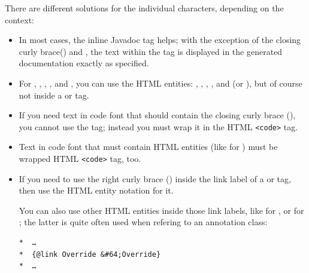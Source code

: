 There are different solutions for the individual characters, depending on the context:
\begin{itemize}
	\item{In most cases, the inline Javadoc tag  helps; with the exception of the closing curly brace(\bdq{\texttt{\}}}) and \bsq{\texttt{*/}}, the text within the tag is displayed in the generated documentation exactly as specified.}

	\item{For 
	\bsq{\texttt{\textless}}, 
	\bsq{\texttt{\textgreater}}, 
	\bsq{\texttt{\&}}, 
	, 
	 and 
	\bsq{\texttt{*/}}, you can use the 
	HTML entities: 
	, 
	, 
	, 
	, 
	 and 
	 (or 
	), but of course not inside a 
	 or 
	 tag.}

	\item{If you need text in code font that should contain the closing curly brace (\bsq{\texttt{\}}}), you cannot use the  tag; instead you must wrap it in the HTML \lstinline|<code>| tag.}

	\item{Text in code font that must contain HTML entities (like  for \bsq{\texttt{*/}}) must be wrapped HTML \lstinline|<code>| tag, too.}

	\item{If you need to use the right curly brace (\bdq{\texttt{\}}}) inside the link label of a  or  tag, then use the HTML entity notation  for it.
	
	You can also use other HTML entities inside those link labels, like  for \bsq{\texttt{*/}}, or  for ; the latter is quite often used when refering to an annotation class:
	
\begin{lstlisting}[language=Comment]
*  …
*  {@link Override &#64;Override}
*  …
\end{lstlisting}}
\end{itemize}

